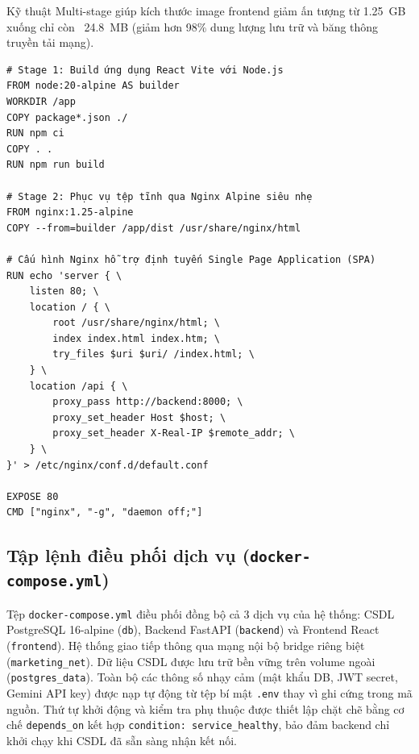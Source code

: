 Kỹ thuật Multi-stage giúp kích thước image frontend giảm ấn tượng từ 1.25~GB xuống chỉ còn ~24.8~MB (giảm hơn 98\% dung lượng lưu trữ và băng thông truyền tải mạng).

\begin{footnotesize}
\begin{verbatim}
# Stage 1: Build ứng dụng React Vite với Node.js
FROM node:20-alpine AS builder
WORKDIR /app
COPY package*.json ./
RUN npm ci
COPY . .
RUN npm run build

# Stage 2: Phục vụ tệp tĩnh qua Nginx Alpine siêu nhẹ
FROM nginx:1.25-alpine
COPY --from=builder /app/dist /usr/share/nginx/html

# Cấu hình Nginx hỗ trợ định tuyến Single Page Application (SPA)
RUN echo 'server { \
    listen 80; \
    location / { \
        root /usr/share/nginx/html; \
        index index.html index.htm; \
        try_files $uri $uri/ /index.html; \
    } \
    location /api { \
        proxy_pass http://backend:8000; \
        proxy_set_header Host $host; \
        proxy_set_header X-Real-IP $remote_addr; \
    } \
}' > /etc/nginx/conf.d/default.conf

EXPOSE 80
CMD ["nginx", "-g", "daemon off;"]
\end{verbatim}
\end{footnotesize}

\subsection{Tập lệnh điều phối dịch vụ (\texttt{docker-compose.yml})}\label{subsec:v8-docker-compose}

Tệp \texttt{docker-compose.yml} điều phối đồng bộ cả 3 dịch vụ của hệ thống: CSDL PostgreSQL 16-alpine (\texttt{db}), Backend FastAPI (\texttt{backend}) và Frontend React (\texttt{frontend}). Hệ thống giao tiếp thông qua mạng nội bộ bridge riêng biệt (\texttt{marketing\_net}). Dữ liệu CSDL được lưu trữ bền vững trên volume ngoài (\texttt{postgres\_data}). Toàn bộ các thông số nhạy cảm (mật khẩu DB, JWT secret, Gemini API key) được nạp tự động từ tệp bí mật \texttt{.env} thay vì ghi cứng trong mã nguồn. Thứ tự khởi động và kiểm tra phụ thuộc được thiết lập chặt chẽ bằng cơ chế \texttt{depends\_on} kết hợp \texttt{condition: service\_healthy}, bảo đảm backend chỉ khởi chạy khi CSDL đã sẵn sàng nhận kết nối.

